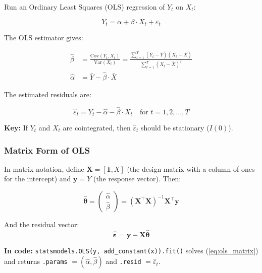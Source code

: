 \documentclass[12pt, a4paper]{article}
\begin{document}
Run an Ordinary Least Squares (OLS) regression of $Y_t$ on $X_t$:

\begin{equation}
    \boxed{Y_t = \alpha + \beta \cdot X_t + \varepsilon_t}
    \label{eq:ols}
\end{equation}

The OLS estimator gives:

\begin{align}
    \hat{\beta} &= \frac{\text{Cov}(Y_t, X_t)}{\text{Var}(X_t)} = \frac{\sum_{t=1}^T (Y_t - \bar{Y})(X_t - \bar{X})}{\sum_{t=1}^T (X_t - \bar{X})^2}
    \label{eq:beta_ols} \\[1em]
    \hat{\alpha} &= \bar{Y} - \hat{\beta} \cdot \bar{X}
    \label{eq:alpha_ols}
\end{align}

The estimated residuals are:

\begin{equation}
    \hat{\varepsilon}_t = Y_t - \hat{\alpha} - \hat{\beta} \cdot X_t \quad \text{for } t = 1, 2, \ldots, T
    \label{eq:residuals}
\end{equation}

\textbf{Key:} If $Y_t$ and $X_t$ are cointegrated, then $\hat{\varepsilon}_t$ should be stationary ($I(0)$).

\subsubsection{Matrix Form of OLS}

In matrix notation, define $\mathbf{X} = [\mathbf{1}, X]$ (the design matrix with a column of ones for the intercept) and $\mathbf{y} = Y$ (the response vector). Then:

\begin{equation}
    \hat{\boldsymbol{\theta}} = \begin{pmatrix} \hat{\alpha} \\ \hat{\beta} \end{pmatrix}
    = (\mathbf{X}^\top \mathbf{X})^{-1} \mathbf{X}^\top \mathbf{y}
    \label{eq:ols_matrix}
\end{equation}

And the residual vector:
\begin{equation}
    \hat{\boldsymbol{\varepsilon}} = \mathbf{y} - \mathbf{X}\hat{\boldsymbol{\theta}}
\end{equation}

\textbf{In code:} \texttt{statsmodels.OLS(y, add\_constant(x)).fit()} solves (\ref{eq:ols_matrix}) 
and returns \texttt{.params} $= (\hat\alpha, \hat\beta)$ and \texttt{.resid} $= \hat\varepsilon_t$.
\end{document}
